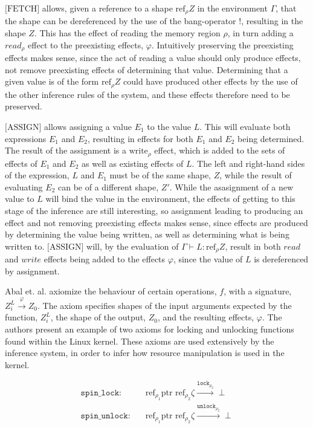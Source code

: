 \newpar $\text{[FETCH]}$ allows, given a reference to a shape $\text{ref}_{\rho} Z$ in the environment $\Gamma$, that the shape can be dereferenced by the use of the bang-operator $!$, resulting in the shape $Z$. This has the effect of reading the memory region $\rho$, in turn adding a $read_\rho$ effect to the preexisting effects, $\varphi$. Intuitively preserving the preexisting effects makes sense, since the act of reading a value should only produce effects, not remove preexisting effects of determining that value. Determining that a given value is of the form $\text{ref}_{\rho} Z$ could have produced other effects by the use of the other inference rules of the system, and these effects therefore need to be preserved.  

\newpar $\text{[ASSIGN]}$ allows assigning a value $E_1$ to the value $L$. This will evaluate both expressions $E_1$ and $E_2$, resulting in effects for both $E_1$ and $E_2$ being determined. The result of the assignment is a $\text{write}_\rho$ effect, which is added to the sets of effects of $E_1$ and $E_2$ as well as existing effects of $L$. The left and right-hand sides of the expression, $L$ and $E_1$ must be of the same shape, $Z$, while the result of evaluating $E_2$ can be of a different shape, $Z'$. While the asasignment of a new value to $L$ will bind the value in the environment, the effects of getting to this stage of the inference are still interesting, so assignment leading to producing an effect and not removing preexisting effects makes sense, since effects are produced by determining the value being written, as well as determining what is being written to. $\text{[ASSIGN]}$ will, by the evaluation of $\Gamma \vdash L: \text{ref}_{\rho} Z$, result in both $read$ and $write$ effects being added to the effects $\varphi$, since the value of $L$ is dereferenced by assignment. 

\newpar Abal et. al. axiomize the behaviour of certain operations, $f$, with a signature, $Z_{i}^{L} \stackrel{\varphi}{\rightarrow} Z_0$. The axiom specifies shapes of the input arguments expected by the function, $Z_{i}^{L}$, the shape of the output, $Z_0$, and the resulting effects, $\varphi$. The authors present an example of two axioms for locking and unlocking functions found within the Linux kernel. These axioms are used extensively by the inference system, in order to infer how resource manipulation is used in the kernel. 

\begin{equation*}
\begin{aligned}
        \texttt{spin\_lock}: \quad & \text{ref}_{\rho_1} \text{ptr } \text{ref}_{\rho_2} \zeta \xrightarrow{{\texttt{lock}}_{\rho_2}}\perp \\
        \texttt{spin\_unlock}: \quad & \text{ref}_{\rho_1} \text{ptr } \text{ref}_{\rho_2} \zeta \xrightarrow{{\texttt{unlock}}_{\rho_2}}\perp
\end{aligned}
\end{equation*}

